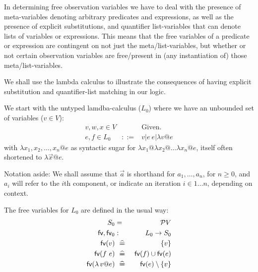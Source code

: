 In determining free observation variables we have to deal with the
presence of meta-variables denoting arbitrary predicates and expressions,
as well as the presence of explicit substitutions, and quantifier list-variables
that can denote lists of variables or expressions.
This means that the free variables of a predicate or expression
are contingent on not just the meta/list-variables,
but whether or not certain observation variables are free/present in (any
instantiation of) those meta/list-variables.

We shall use the lambda calculus to illustrate the consequences
of having explicit substitution and quantifier-list matching in our logic.

We start with the untyped lamdba-calculus ($L_0$) where we have an unbounded set of variables ($v \in V$):
\begin{eqnarray*}
   v,w,x \in V && \mbox{Given.}
\\ e,f \in L_0 & ::=& v | e~e| \lambda v @ e
\end{eqnarray*}
with $\lambda x_1,x_2,\ldots,x_n @ e$
as syntactic sugar for
$\lambda x_1 @ \lambda x_2 @ \ldots \lambda x_n @ e$,
itself often shortened to $\lambda \vec x @ e$.

Notation aside: We shall assume that $\vec a$ is shorthand for $a_1,\ldots,a_n$,
for $n \geq 0$, and $a_i$ will refer to the $i$th component, or indicate
an iteration $i \in 1\ldots n$, depending on context.

The free variables for $L_0$ are defined in the usual way:
\begin{eqnarray*}
   S_0 &=& \power V
\\ \fv,\fv_0 &:& L_0 \fun S_0
\\ \fv(v) &\defs& \setof v
\\ \fv(f~e) &\defs& \fv(f) \union \fv(e)
\\ \fv(\lambda v @ e) &\defs& \fv(e) \setminus \setof v
\end{eqnarray*}

